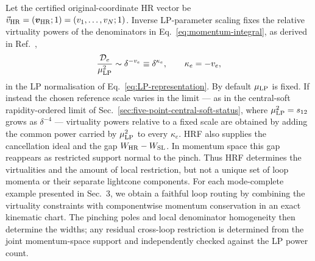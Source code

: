 \documentclass[a4paper,11pt]{article}
\newcommand{\HR}{\mathrm{HR}}
\newcommand{\WSL}{W_{\rm SL}}
\newcommand{\WHR}{W_{\rm HR}}
\newcommand{\vHR}{\vec v_{\rm HR}}
\begin{document}
Let the certified original-coordinate HR vector be
\(\vHR=(\boldsymbol v_{\HR};1)=(v_1,\ldots,v_N;1)\).  Inverse
LP-parameter scaling fixes the
relative virtuality powers of the denominators in
Eq.~\eqref{eq:momentum-integral}, as derived in
Ref.~\cite[Sec.~2.3, especially Eqs.~(46)--(48), and App.~B]{Gardi:2022khw},
\begin{equation}
 \frac{\mathcal D_e}{\mu_{\rm LP}^2}\sim\delta^{-v_e}
 \equiv\delta^{\kappa_e},
 \qquad \kappa_e=-v_e,
 \label{eq:inverse-schwinger-rule}
\end{equation}
in the LP normalisation of Eq.~\eqref{eq:LP-representation}.  By default
\(\mu_{\rm LP}\) is fixed.  If instead the chosen reference scale varies in
the limit --- as in the central-soft rapidity-ordered limit of
Sec.~\ref{sec:five-point-central-soft-status}, where
\(\mu_{\rm LP}^2=s_{12}\) grows as \(\delta^{-4}\) --- virtuality powers relative to a
fixed scale are obtained by adding the common power carried by
\(\mu_{\rm LP}^2\) to every \(\kappa_e\).  HRF also supplies the cancellation ideal and the gap
\(\WHR-\WSL\).  In momentum space this gap reappears as restricted support
normal to the pinch.  Thus HRF determines the virtualities and the amount of
local restriction, but not a unique set of loop momenta or their separate
lightcone components.  For each mode-complete example presented in
Sec.~3, we obtain a faithful loop routing by combining the virtuality constraints with
componentwise momentum conservation in an exact kinematic chart.  The
pinching poles and local denominator homogeneity then determine the widths;
any residual cross-loop restriction is determined from the joint
momentum-space support and independently checked against the LP power count.
\end{document}
